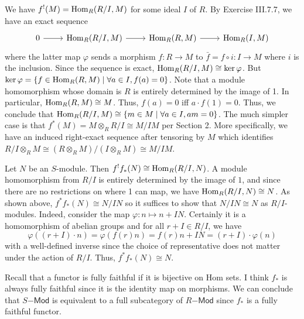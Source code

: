 \documentclass[../../master.tex]{subfiles}
\begin{document}
\begin{solution}
    We have $f^{!}(M) = \operatorname{Hom}_R(R/I, M)$ for some ideal $I$ of $R$.
    By Exercise III.7.7, we have an exact sequence
    \[
    \begin{tikzcd}
        0 & \Hom_R(R/I, M) & \Hom_R(R, M) & \Hom_R(I, M)
        \arrow[from=1-1, to=1-2] 
        \arrow[from=1-2, to=1-3] 
        \arrow[from=1-3, to=1-4] 
    \end{tikzcd}
    \]
    where the latter map $\varphi$ sends a morphism $f: R \to M$ to $\bar{f} = f \circ i: I \to M$ where $i$ is the inclusion.
    Since the sequence is exact, $\operatorname{Hom}_R(R/I, M) \cong \ker \varphi$.
    But $\ker \varphi = \{f \in \operatorname{Hom}_R(R, M) \mid \forall a \in I, f(a) = 0\}$.
    Note that a module homomorphism whose domain is $R$ is entirely determined by the image of 1.
    In particular, $\operatorname{Hom}_R(R, M) \cong M$.
    Thus, $f(a) = 0$ iff $a \cdot f(1) = 0$.
    Thus, we conclude that $\operatorname{Hom}_R(R/I, M) \cong \{m \in M \mid \forall a \in I, am = 0\}$.
    The much simpler case is that $f^{*}(M) = M \otimes_R R/I \cong M/IM$ per Section 2.
    More specifically, we have an induced right-exact sequence after tensoring by $M$ which identifies $R/I \otimes_R M \cong (R \otimes_R M) / (I \otimes_R M) \cong M/IM$.

    Let $N$ be an $S$-module.
    Then $f^{!}f_*(N) \cong \operatorname{Hom}_R(R/I, N)$.
    A module homomorphism from $R/I$ is entirely determined by the image of $1$, and since there are no restrictions on where 1 can map, we have $\operatorname{Hom}_R(R/I, N) \cong N$.
    As shown above, $f^{*}f_*(N) \cong N/IN$ so it suffices to show that $N/IN \cong N$ as $R/I$-modules.
    Indeed, consider the map $\varphi: n \mapsto n + IN$.
    Certainly it is a homomorphism of abelian groups and for all $r + I \in R/I$, we have
     \[
         \varphi((r + I) \cdot n) = \varphi(f(r)n) = f(r)n + IN = (r + I) \cdot \varphi(n)
    \]
    with a well-defined inverse since the choice of representative does not matter under the action of $R/I$.
    Thus, $f^{*}f_*(N) \cong N$.

    Recall that a functor is fully faithful if it is bijective on Hom sets.
    I think $f_*$ is always fully faithful since it is the identity map on morphisms.
    We can conclude that $S\mathsf{-Mod}$ is equivalent to a full subcategory of $R\mathsf{-Mod}$ since $f_*$ is a fully faithful functor.
\end{solution}
\end{document}
